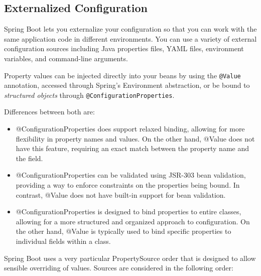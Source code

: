 \documentclass{scrartcl}
\begin{document}
\subsection{Externalized Configuration}

Spring Boot lets you externalize your configuration so that you can work with the same application code in different environments. You can use a variety of external configuration sources including Java properties files, YAML files, environment variables, and command-line arguments.

Property values can be injected directly into your beans by using the \lstinline |@Value| annotation, accessed through Spring’s Environment abstraction, or be bound to \textit{structured objects} through \lstinline[]|@ConfigurationProperties|.

Differences between both are:

\begin{itemize}
    \item @ConfigurationProperties does support relaxed binding, allowing for more flexibility in property names and values. On the other hand, @Value does not have this feature, requiring an exact match between the property name and the field.
    \item @ConfigurationProperties can be validated using JSR-303 bean validation, providing a way to enforce constraints on the properties being bound. In contrast, @Value does not have built-in support for bean validation.
    \item @ConfigurationProperties is designed to bind properties to entire classes, allowing for a more structured and organized approach to configuration. On the other hand, @Value is typically used to bind specific properties to individual fields within a class.
\end{itemize}

Spring Boot uses a very particular PropertySource order that is designed to allow sensible overriding of values. Sources are considered in the following order:
\end{document}
